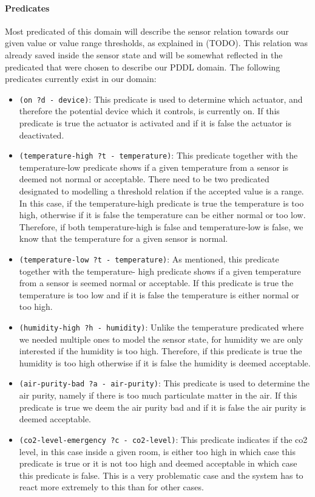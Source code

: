 \paragraph{Predicates}
Most predicated of this domain will describe the sensor relation towards our given value or value range thresholds, as explained in (TODO).
This relation was already saved inside the sensor state and will be somewhat reflected in the predicated that were chosen to describe our PDDL domain.
The following predicates currently exist in our domain:
\begin{itemize}
    \item \texttt{(on ?d - device)}: This predicate is used to determine which actuator, and therefore the potential device which it controls, is currently on.
    If this predicate is true the actuator is activated and if it is false the actuator is deactivated.
    \item \texttt{(temperature-high ?t - temperature)}: This predicate together with the temperature-low predicate shows if a given temperature from a sensor is deemed not normal or acceptable.
    There need to be two predicated designated to modelling a threshold relation if the accepted value is a range.
    In this case, if the temperature-high predicate is true the temperature is too high, otherwise if it is false the temperature can be either normal or too low.
    Therefore, if both temperature-high is false and temperature-low is false, we know that the temperature for a given sensor is normal.
    \item \texttt{(temperature-low ?t - temperature)}: As mentioned, this predicate together with the temperature- high predicate shows if a given temperature from a sensor is seemed normal or acceptable.
    If this predicate is true the temperature is too low and if it is false the temperature is either normal or too high.
    \item \texttt{(humidity-high ?h - humidity)}: Unlike the temperature predicated where we needed multiple ones to model the sensor state, for humidity we are only interested if the humidity is too high.
    Therefore, if this predicate is true the humidity is too high otherwise if it is false the humidity is deemed acceptable.
    \item \texttt{(air-purity-bad ?a - air-purity)}: This predicate is used to determine the air purity, namely if there is too much particulate matter in the air.
    If this predicate is true we deem the air purity bad and if it is false the air purity is deemed acceptable.
    \item \texttt{(co2-level-emergency ?c - co2-level)}: This predicate indicates if the co2 level, in this case inside a given room, is either too high in which case this predicate is true or it is not too high and deemed acceptable in which case this predicate is false.
    This is a very problematic case and the system has to react more extremely to this than for other cases.
\end{itemize}

